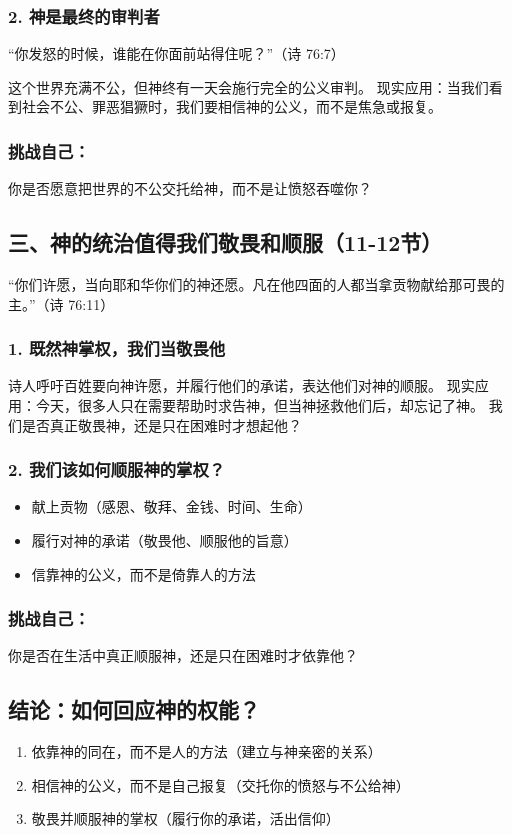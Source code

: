 \documentclass[a4paper, 12pt]{article}
\begin{document}
\subsubsection*{2. 神是最终的审判者}
“你发怒的时候，谁能在你面前站得住呢？”（诗 76:7）

这个世界充满不公，但神终有一天会施行完全的公义审判。
现实应用：当我们看到社会不公、罪恶猖獗时，我们要相信神的公义，而不是焦急或报复。
\subsubsection*{挑战自己：}

你是否愿意把世界的不公交托给神，而不是让愤怒吞噬你？
\subsection*{三、神的统治值得我们敬畏和顺服（11-12节）}
“你们许愿，当向耶和华你们的神还愿。凡在他四面的人都当拿贡物献给那可畏的主。”（诗 76:11）

\subsubsection*{1. 既然神掌权，我们当敬畏他}
诗人呼吁百姓要向神许愿，并履行他们的承诺，表达他们对神的顺服。
现实应用：今天，很多人只在需要帮助时求告神，但当神拯救他们后，却忘记了神。
我们是否真正敬畏神，还是只在困难时才想起他？
\subsubsection*{2. 我们该如何顺服神的掌权？}
\begin{itemize}
    \item 献上贡物（感恩、敬拜、金钱、时间、生命）

    \item 履行对神的承诺（敬畏他、顺服他的旨意）

    \item 信靠神的公义，而不是倚靠人的方法

\end{itemize}
\subsubsection*{挑战自己：}

你是否在生活中真正顺服神，还是只在困难时才依靠他？
\subsection*{结论：如何回应神的权能？}
\begin{enumerate}
    \item 依靠神的同在，而不是人的方法（建立与神亲密的关系）

    \item 相信神的公义，而不是自己报复（交托你的愤怒与不公给神）

    \item 敬畏并顺服神的掌权（履行你的承诺，活出信仰）

\end{enumerate}
\end{document}
